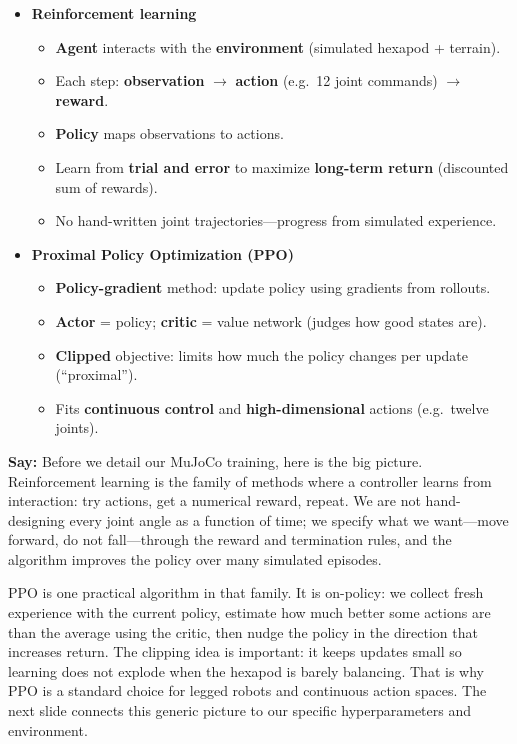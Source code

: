 \documentclass[11pt]{article}
\begin{document}
\begin{itemize}
  \item \textbf{Reinforcement learning}
  \begin{itemize}
    \item \textbf{Agent} interacts with the \textbf{environment} (simulated hexapod + terrain).
    \item Each step: \textbf{observation} $\rightarrow$ \textbf{action} (e.g.\ 12 joint commands) $\rightarrow$ \textbf{reward}.
    \item \textbf{Policy} maps observations to actions.
    \item Learn from \textbf{trial and error} to maximize \textbf{long-term return} (discounted sum of rewards).
    \item No hand-written joint trajectories---progress from simulated experience.
  \end{itemize}
  \item \textbf{Proximal Policy Optimization (PPO)}
  \begin{itemize}
    \item \textbf{Policy-gradient} method: update policy using gradients from rollouts.
    \item \textbf{Actor} = policy; \textbf{critic} = value network (judges how good states are).
    \item \textbf{Clipped} objective: limits how much the policy changes per update (``proximal'').
    \item Fits \textbf{continuous control} and \textbf{high-dimensional} actions (e.g.\ twelve joints).
  \end{itemize}
\end{itemize}

\textbf{Say:}
Before we detail our MuJoCo training, here is the big picture. Reinforcement learning is the family of methods where a controller learns from interaction: try actions, get a numerical reward, repeat. We are not hand-designing every joint angle as a function of time; we specify what we want---move forward, do not fall---through the reward and termination rules, and the algorithm improves the policy over many simulated episodes.

PPO is one practical algorithm in that family. It is on-policy: we collect fresh experience with the current policy, estimate how much better some actions are than the average using the critic, then nudge the policy in the direction that increases return. The clipping idea is important: it keeps updates small so learning does not explode when the hexapod is barely balancing. That is why PPO is a standard choice for legged robots and continuous action spaces. The next slide connects this generic picture to our specific hyperparameters and environment.
\end{document}
